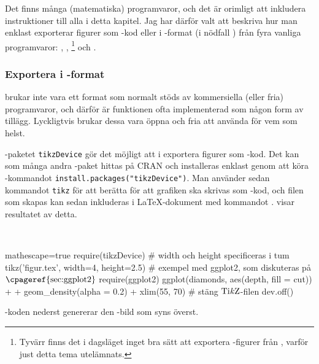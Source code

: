\documentclass[lang=sv,ptsize=10pt,font=none,nomath,titles=bf,../../a4.tex]{subfiles}
\begin{document}
Det finns många (matematiska) programvaror, och det är orimligt att
inkludera instruktioner till alla i detta kapitel. Jag har därför valt
att beskriva hur man enklast exporterar figurer som \PGFTikZ-kod eller
i \PDF-format (i nödfall \PNG) från fyra vanliga programvaror:
\Rlogo, \MATLAB, \Mathematica\footnote{Tyvärr finns det i dagsläget inget
bra sätt att exportera \PGFTikZ-figurer från \Mathematica, varför just
detta tema utelämnats.} och \gnuplot.

\subsubsection{Exportera i \PGFTikZ-format}
\PGFTikZ brukar inte vara ett format som normalt stöds av kommersiella
(eller fria) programvaror, och därför är funktionen ofta implementerad
som någon form av tillägg. Lyckligtvis brukar dessa vara öppna och fria
att använda för vem som helst.

\Rlogo-paketet \texttt{tikzDevice} \parencite{Sharpsteen12} gör det möjligt
att i \Rlogo exportera figurer som \PGFTikZ-kod. Det kan som många andra
\Rlogo-paket hittas på CRAN och installeras enklast genom att köra
\Rlogo-kommandot \verb|install.packages("tikzDevice")|. Man använder
sedan kommandot \texttt{tikz} för att berätta för \Rlogo att grafiken
ska skrivas som \PGFTikZ-kod, och filen som skapas kan sedan inkluderas
i \LaTeX-dokument med kommandot .
 visar resultatet av detta.

\begin{kod}[tbp]
	\centering
	\begin{minipage}{\textwidth}
		\centering
		
	\end{minipage}
	\\[1ex]
	\begin{minipage}{\textwidth}
		\begin{rcode*}{mathescape=true}
require(tikzDevice)
# width och height specificeras i tum
tikz('figur.tex', width=4, height=2.5)
# exempel med ggplot2, som diskuteras på $\text{\cpageref{sec:ggplot2}}$
require(ggplot2)
ggplot(diamonds, aes(depth, fill = cut)) +
  + geom_density(alpha = 0.2) + xlim(55, 70)
# stäng $\text{Ti\textit{k}Z}$-filen
dev.off()
		\end{rcode*}
	\end{minipage}
	\caption{\Rlogo-koden nederst genererar den \PGFTikZ-bild som
	syns överst.}
	\label{ex:tikzdevice}
\end{kod}
\end{document}
